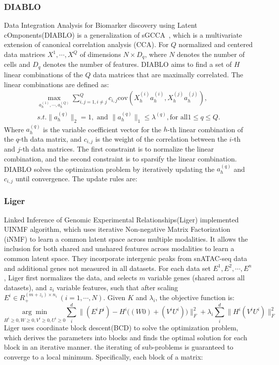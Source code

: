 \subsubsection{DIABLO}
Data Integration Analysis for Biomarker discovery using Latent cOmponents(DIABLO) is a generalization of sGCCA~\citep{tenenhaus2014variable}, which is a multivariate extension of canonical correlation analysis (CCA). For $Q$ normalized and centered data matrices $X^1, \cdots, X^Q$ of dimensions $N\times D_q$, where $N$ denotes the number of cells and $D_q$ denotes the number of features. DIABLO aims to find a set of $H$ linear combinations of the $Q$ data matrices that are maximally correlated. The linear combinations are defined as:
\begin{equation}
\begin{aligned}
	\underset{a_h^{(1)},\cdots,a_h^{(Q)}}{\max} \sum_{i,j=1, i\neq j}^Q c_{i,j} \text{cov}(X_h^{(i)} a_h^{(i)}, X_h^{(j)} a_h^{(j)}),\\
	s.t. \|a_h^{(q)}\|_2 = 1, \text{ and } \|a_h^{(q)}\|_1 \leq \lambda^{(q)}, \text{for all} 1\leq q \leq Q.
\end{aligned}
\end{equation}
Where $a_h^{(q)}$ is the variable coefficient vector for the $h$-th linear combination of the $q$-th data matrix, and $c_{i,j}$ is the weight of the correlation between the $i$-th and $j$-th data matrices. The first constraint is to normalize the linear combination, and the second constraint is to sparsify the linear combination. DIABLO solves the optimization problem by iteratively updating the $a_h^{(q)}$ and $c_{i,j}$ until convergence. The update rules are:



\subsubsection{Liger}
Linked Inference of Genomic Experimental Relationships(Liger)\citep{kriebel2022uinmf} implemented UINMF algorithm, which uses iterative Non-negative Matrix Factorization (iNMF) to learn a common latent space across multiple modalities. It allows the inclusion for both shared and unshared features across modalities to learn a common latent space. They incorporate intergenic peaks from snATAC-seq data and additional genes not measured in all datasets. For each data set $E^1, E^2, \cdots, E^n$, Liger first normalizes the data, and selects $m$ variable genes (shared across all datasets), and $z_i$ variable features, such that after scaling $E^i \in R_{+}^{(m+z_i)\times n_i}\ (i=1,\cdots,N)$. Given $K$ and $\lambda_i$, the objective function is:
\begin{equation}
	\underset{H^i\geq 0,W\geq 0, V^i\geq 0, U^i \geq 0}{\arg\min} \sum_i^{d}\Big\| (E^i P^i) - H^i \big((W 0) + (V^i U^i)\big)\Big\|_{F}^2 + \lambda_i\sum_i^d\Big\|H^i(V^i U^i)\Big\|_{F}^2
\end{equation}
Liger uses coordinate block descent(BCD) to solve the optimization problem, which derives the parameters into blocks and finds the optimal solution for each block in an iterative manner. the iterating of sub-problems is guaranteed to converge to a local minimum. Specifically, each block of a matrix:

